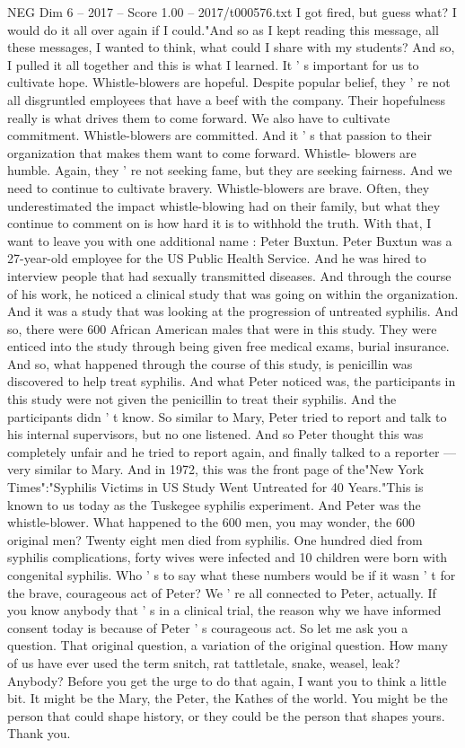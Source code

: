 \begin{textsample}{NEG Dim 6 – 2017 – Score 1.00 – 2017/t000576.txt}
I got fired, but guess what?
I would do it all over again if I could."And so as I kept reading this message, all these messages, I wanted to think, what could I share with my students?
And so, I pulled it all together and this is what I learned.
It ' s important for us to cultivate hope.
Whistle-blowers are hopeful.
Despite popular belief, they ' re not all disgruntled employees that have a beef with the company.
Their hopefulness really is what drives them to come forward.
We also have to cultivate commitment.
Whistle-blowers are committed.
And it ' s that passion to their organization that makes them want to come forward.
Whistle- blowers are humble.
Again, they ' re not seeking fame, but they are seeking fairness.
And we need to continue to cultivate bravery.
Whistle-blowers are brave.
Often, they underestimated the impact whistle-blowing had on their family, but what they continue to comment on is how hard it is to withhold the truth.
With that, I want to leave you with one additional name : Peter Buxtun.
Peter Buxtun was a 27-year-old employee for the US Public Health Service.
And he was hired to interview people that had sexually transmitted diseases.
And through the course of his work, he noticed a clinical study that was going on within the organization.
And it was a study that was looking at the progression of untreated syphilis.
And so, there were 600 African American males that were in this study.
They were enticed into the study through being given free medical exams, burial insurance.
And so, what happened through the course of this study, is penicillin was discovered to help treat syphilis.
And what Peter noticed was, the participants in this study were not given the penicillin to treat their syphilis.
And the participants didn ' t know.
So similar to Mary, Peter tried to report and talk to his internal supervisors, but no one listened.
And so Peter thought this was completely unfair and he tried to report again, and finally talked to a reporter — very similar to Mary.
And in 1972, this was the front page of the"New York Times":"Syphilis Victims in US Study Went Untreated for 40 Years."This is known to us today as the Tuskegee syphilis experiment.
And Peter was the whistle-blower.
What happened to the 600 men, you may wonder, the 600 original men?
Twenty eight men died from syphilis.
One hundred died from syphilis complications, forty wives were infected and 10 children were born with congenital syphilis.
Who ' s to say what these numbers would be if it wasn ' t for the brave, courageous act of Peter?
We ' re all connected to Peter, actually.
If you know anybody that ' s in a clinical trial, the reason why we have informed consent today is because of Peter ' s courageous act.
So let me ask you a question.
That original question, a variation of the original question.
How many of us have ever used the term snitch, rat tattletale, snake, weasel, leak?
Anybody?
Before you get the urge to do that again, I want you to think a little bit.
It might be the Mary, the Peter, the Kathes of the world.
You might be the person that could shape history, or they could be the person that shapes yours.
Thank you.

\end{textsample}

